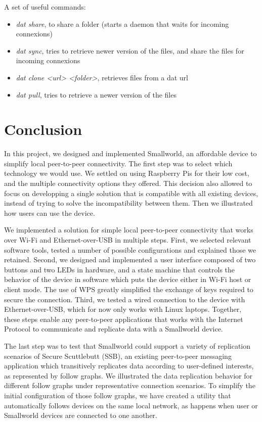 \documentclass[a4paper,11pt,oneside]{report}
\begin{document}
A set of useful commands:
\begin{itemize}
  \item \emph{dat share}, to share a folder (starts a daemon that waits for incoming connexions)
  \item \emph{dat sync}, tries to retrieve newer version of the files, and share the files for incoming connexions
  \item \emph{dat clone <url> <folder>}, retrieves files from a dat url
  \item \emph{dat pull}, tries to retrieve a newer version of the files
\end{itemize}


\chapter{Conclusion}

In this project, we designed and implemented Smallworld, an affordable device to simplify local peer-to-peer connectivity. The first step was to select which technology we would use. We settled on using Raspberry Pis for their low cost, and the multiple connectivity options they offered. This decision also allowed to focus on developping a single solution that is compatible with all existing devices, instead of trying to solve the incompatibility between them. Then we illustrated how users can use the device.

We implemented a solution for simple local peer-to-peer connectivity that works over Wi-Fi and Ethernet-over-USB in multiple steps. First, we selected relevant software tools, tested a number of possible configurations and explained those we retained. Second, we designed and implemented a user interface composed of two buttons and two LEDs in hardware, and a state machine that controls the behavior of the device in software which puts the device either in Wi-Fi host or client mode. The use of WPS greatly simplified the exchange of keys required to secure the connection. Third, we tested a wired connection to the device with Ethernet-over-USB, which for now only works with Linux laptops. Together, these steps enable any peer-to-peer applications that works with the Internet Protocol to communicate and replicate data with a Smallworld device.

The last step was to test that Smallworld could support a variety of replication scenarios of Secure Scuttlebutt (SSB), an existing peer-to-peer messaging application which transitively replicates data according to user-defined interests, as represented by follow graphs. We illustrated the data replication behavior for different follow graphs under representative connection scenarios. To simplify the initial configuration of those follow graphs, we have created a utility that automatically follows devices on the same local network, as happens when user or Smallworld devices are connected to one another.
\end{document}
